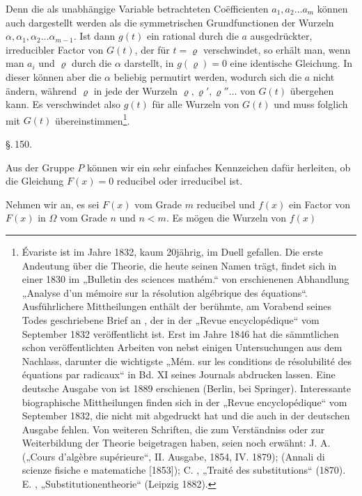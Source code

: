 Denn die als unabhängige Variable betrachteten Co\"efficienten
$a_1, a_2 \ldots a_m$ können auch dargestellt werden als die symmetrischen
Grundfunctionen der Wurzeln $\alpha, \alpha_1, \alpha_2 \ldots \alpha_{m-1}$.
Ist dann $g(t)$ ein rational durch die $a$ ausgedrückter, irreducibler Factor
von $G(t)$, der für $t = \varrho$ verschwindet, so erhält man, wenn man $a_i$
und $\varrho$ durch die $\alpha$ darstellt, in $g(\varrho) = 0$ eine identische
Gleichung. In dieser können aber die $\alpha$ beliebig permutirt werden,
wodurch sich die $a$ nicht ändern, während $\varrho$ in jede der Wurzeln
$\varrho, \varrho', \varrho'' \ldots$ von $G(t)$ übergehen kann. Es
verschwindet also $g(t)$ für alle Wurzeln von $G(t)$ und muss folglich mit
$G(t)$ übereinstimmen\footnote{Évariste  ist im Jahre 1832,
kaum 20jährig, im Duell gefallen. Die erste Andeutung über die Theorie, die
heute seinen Namen trägt, findet sich in einer 1830 im „Bulletin des sciences
mathém.“ von  erschienenen Abhandlung „Analyse d'un mémoire sur la
résolution algébrique des équations“. Ausführlichere Mittheilungen enthält
der berühmte, am Vorabend seines Todes geschriebene Brief an , der in der „Revue encyclopédique“ vom September 1832
veröffentlicht ist. Erst im Jahre 1846 hat  die sämmtlichen schon
veröffentlichten Arbeiten von  nebst einigen Untersuchungen aus dem
Nachlass, darunter die wichtigste „Mém. sur les conditions de résolubilité
des équations par radicaux“ in Bd. XI seines Journals abdrucken lassen. Eine
deutsche Ausgabe von  ist 1889 erschienen (Berlin, bei Springer).
Interessante biographische Mittheilungen finden sich in der „Revue
encyclopédique“ vom September 1832, die  nicht mit abgedruckt hat
und die auch in der deutschen Ausgabe fehlen. Von weiteren Schriften, die zum
Verständniss oder zur Weiterbildung der  Theorie beigetragen
haben, seien noch erwähnt: J. A.  („Cours d'algèbre supérieure“,
II. Ausgabe, 1854, IV. 1879);  (Annali di scienze fisiche e matematiche
[1853]); C. , „Traité des substitutions“ (1870). E. ,
„Substitutionentheorie“ (Leipzig 1882).}.

\begin{center}
\S.\,150.

\end{center}

Aus der  Gruppe $P$ können wir ein sehr
einfaches Kennzeichen dafür herleiten, ob die Gleichung $F(x) = 0$ reducibel
oder irreducibel ist.

Nehmen wir an, es sei $F(x)$ vom Grade $m$ reducibel und $f(x)$ ein Factor
von $F(x)$ in $\Omega$ vom Grade $n$ und $n < m$. Es mögen die Wurzeln von
$f(x)$
